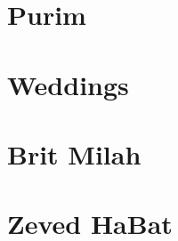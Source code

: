 \documentclass[letterpaper]{memoir}
\newcommand{\song}[2]{}
\begin{document}
\chapter{Purim}
\song{Ronu Gilu}{Ronu_Gilu.pdf}
\song{Or Gilah}{Or_Gilah.pdf} %
\song{El Melech Ne'eman}{El_Melech_Neeman.pdf}
\song{Ezer Mitzarai}{Ezer_Mitzarai.pdf}
\song{Simeni Rosh}{Simeni_Rosh.pdf}
\song{Chish Misgabi Geulah}{Chish_Misgabi_Geulah.pdf}
\song{Eli Tzur Yishuati}{Eli_Tzur_Yishuati.pdf}

\chapter{Weddings}
\song{Yismach Hatani}{Yismach_Hatani.pdf}
\song{El Me'od Na'alah}{El_Meod_Naalah.pdf}
\song{Im Chacham Libecha Beni}{Im_Chacham_Libecha_Beni.pdf}
\song{Makhelot Am}{Makhelot_Am.pdf}
\song{Et Dodim Kalah}{Et_Dodim_Kalah.pdf}

\chapter{Brit Milah}
\song{Mah Tov Mah Na'im}{Mah_Tov_Mah_Naim.pdf}
\song{Yehi Shalom b'Cheleinu (Yerushalmi)}{Yehi_Shalom_bCheleinu_Yerushalmi.pdf}
\song{Yehi Shalom B'Cheleinu (Syrian)}{Yehi_Shalom_bCheleinu_Syrian.pdf}
\song{Atah Ahuvi}{Atah_Ahuvi.pdf}

\chapter{Zeved HaBat}
\song{Nava Yafa Tz'viyah}{Nava_Yafa_Tzviyah.pdf}
\song{Yifat Ayin}{Yifat_Ayin.pdf}
\song{Ya'alah Ya'alah}{Yaalah_Yaalah.pdf}
\end{document}
